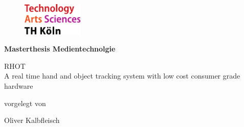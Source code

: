 \begin{titlepage}

\begin{center}

\begin{figure}[!ht]
		\includegraphics[width=0.26\textwidth]{images/THlogoheader.pdf}
\end{figure}

\vspace{0.4cm}

\begin{rmfamily}
\begin{huge}
\textbf{Masterthesis Medientechnolgie}\\	
\end{huge}
\vspace{0.5cm}
\begin{LARGE}
RHOT\\
 A real time hand and object tracking system with low cost consumer grade hardware
\end{LARGE}
\end{rmfamily}

\vspace{0.8cm}



\begin{large}
vorgelegt von\\ 
\vspace{0.3cm}
\begin{LARGE}
Oliver Kalbfleisch \\
\end{LARGE}
\end{large}


\end{center}
\end{titlepage}
